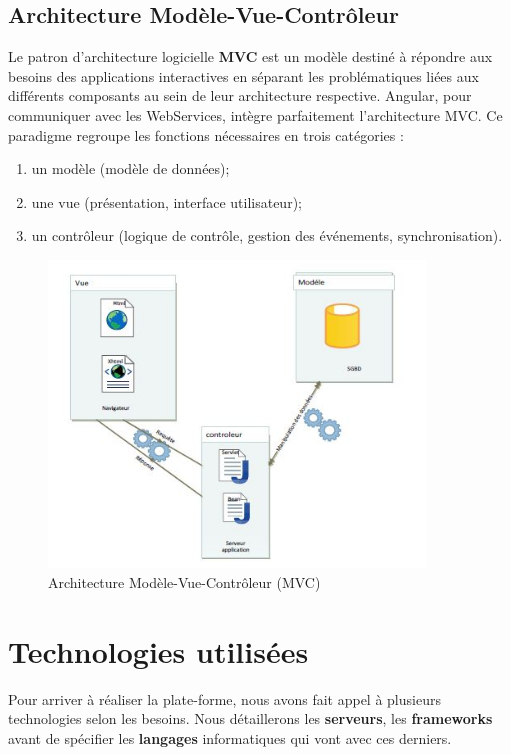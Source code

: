 \documentclass[12pt]{report}
\begin{document}
	\subsection{Architecture Modèle-Vue-Contrôleur}
	  Le patron d'architecture logicielle \textbf{\gls{MVC}} est un modèle destiné à répondre aux besoins des applications interactives en séparant les problématiques liées aux différents composants au sein de leur architecture respective. Angular, pour communiquer avec les WebServices, intègre parfaitement l'architecture \gls{MVC}. Ce paradigme regroupe les fonctions nécessaires en trois catégories :
	  \begin{enumerate}
	    \item un modèle (modèle de données);
	    \item une vue (présentation, interface utilisateur);
	    \item un contrôleur (logique de contrôle, gestion des événements, synchronisation).
	  \end{enumerate}

	  \begin{figure}[H]
	    \begin{center}
	      \includegraphics[scale=0.6, width=10cm]{images/mvc.JPG}
	      \caption{Architecture Modèle-Vue-Contrôleur (MVC)}
	    \end{center}
	  \end{figure} 
      
      \section{Technologies utilisées}
	Pour arriver à réaliser la plate-forme, nous avons fait appel à plusieurs technologies selon les besoins. Nous détaillerons les \textbf{serveurs}, les \textbf{frameworks} avant de spécifier les \textbf{langages} informatiques qui vont avec ces derniers.
	
\end{document}
